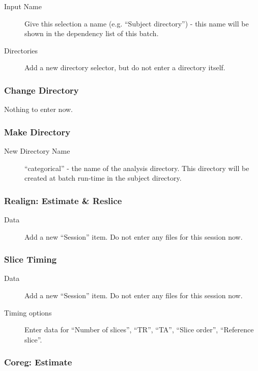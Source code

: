 \begin{description}
\item[Input Name] Give this selection a name (e.g. ``Subject directory'') -
  this name will be shown in the dependency list of this batch.
\item[Directories] Add a new directory selector, but do not enter a
  directory itself.
\end{description}

\subsubsection*{Change Directory} 

Nothing to enter now.

\subsubsection*{Make Directory}

\begin{description}
\item[New Directory Name] ``categorical'' - the name of the analysis
  directory. This directory will be created at batch run-time in the subject
  directory. 
\end{description}

\subsubsection*{Realign: Estimate \& Reslice}

\begin{description}
\item[Data] Add a new ``Session'' item. Do not enter any files for this
  session now.
\end{description}

\subsubsection*{Slice Timing}

\begin{description}
\item[Data] Add a new ``Session'' item. Do not enter any files for this
  session now.
\item[Timing options] Enter data for ``Number of slices'', ``TR'', ``TA'',
  ``Slice order'', ``Reference slice''.
\end{description}

\subsubsection*{Coreg: Estimate} 

